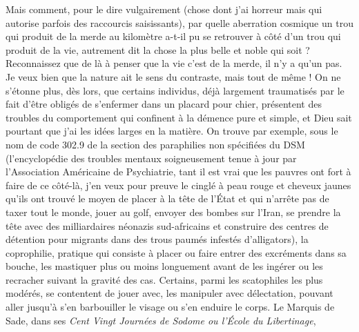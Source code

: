 Mais comment, pour le dire vulgairement (chose dont j’ai horreur mais qui autorise parfois des raccourcis saisissants), par quelle aberration cosmique un trou qui produit de la merde au kilomètre a-t-il pu se retrouver à côté d’un trou qui produit de la vie, autrement dit la chose la plus belle et noble qui soit ? Reconnaissez que de là à penser que la vie c’est de la merde, il n’y a qu’un pas. Je veux bien que la nature ait le sens du contraste, mais tout de même ! On ne s’étonne plus, dès lors, que certains individus, déjà largement traumatisés par le fait d’être obligés de s’enfermer dans un placard pour chier, présentent des troubles du comportement qui confinent à la démence pure et simple, et Dieu sait pourtant que j’ai les idées larges en la matière. On trouve par exemple, sous le nom de code 302.9 de la section des paraphilies non spécifiées du DSM (l’encyclopédie des troubles mentaux soigneusement tenue à jour par l’Association %
%
%
%
Américaine de Psychiatrie, tant il est vrai que les pauvres ont fort à faire de ce côté-là, j’en veux pour preuve le cinglé à peau rouge et cheveux jaunes qu’ils ont trouvé le moyen de placer à la tête de l’État et qui n’arrête pas de taxer tout le monde, jouer au golf, envoyer des bombes sur l’Iran, se prendre la tête avec des milliardaires néonazis sud-africains et construire des centres de détention pour migrants dans des trous paumés infestés d’alligators), la coprophilie, pratique qui consiste à placer ou faire entrer des excréments dans sa bouche, les mastiquer plus ou moins longuement avant de les ingérer ou les recracher suivant la gravité des cas. Certains, parmi les scatophiles les plus modérés, se contentent de jouer avec, les manipuler avec délectation, pouvant aller jusqu’à s’en barbouiller le visage ou s’en enduire le corps. Le Marquis de Sade, dans ses \textit{Cent Vingt Journées de Sodome ou l’École du Libertinage}, %
